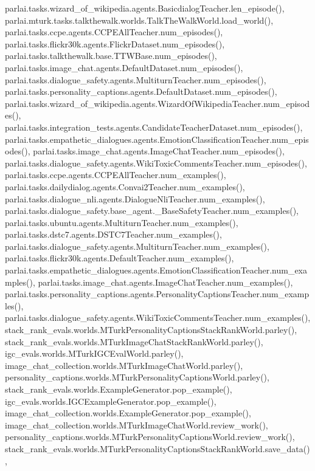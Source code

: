 parlai.\+tasks.\+wizard\+\_\+of\+\_\+wikipedia.\+agents.\+Basicdialog\+Teacher.\+len\+\_\+episode(), parlai.\+mturk.\+tasks.\+talkthewalk.\+worlds.\+Talk\+The\+Walk\+World.\+load\+\_\+world(), parlai.\+tasks.\+ccpe.\+agents.\+C\+C\+P\+E\+All\+Teacher.\+num\+\_\+episodes(), parlai.\+tasks.\+flickr30k.\+agents.\+Flickr\+Dataset.\+num\+\_\+episodes(), parlai.\+tasks.\+talkthewalk.\+base.\+T\+T\+W\+Base.\+num\+\_\+episodes(), parlai.\+tasks.\+image\+\_\+chat.\+agents.\+Default\+Dataset.\+num\+\_\+episodes(), parlai.\+tasks.\+dialogue\+\_\+safety.\+agents.\+Multiturn\+Teacher.\+num\+\_\+episodes(), parlai.\+tasks.\+personality\+\_\+captions.\+agents.\+Default\+Dataset.\+num\+\_\+episodes(), parlai.\+tasks.\+wizard\+\_\+of\+\_\+wikipedia.\+agents.\+Wizard\+Of\+Wikipedia\+Teacher.\+num\+\_\+episodes(), parlai.\+tasks.\+integration\+\_\+tests.\+agents.\+Candidate\+Teacher\+Dataset.\+num\+\_\+episodes(), parlai.\+tasks.\+empathetic\+\_\+dialogues.\+agents.\+Emotion\+Classification\+Teacher.\+num\+\_\+episodes(), parlai.\+tasks.\+image\+\_\+chat.\+agents.\+Image\+Chat\+Teacher.\+num\+\_\+episodes(), parlai.\+tasks.\+dialogue\+\_\+safety.\+agents.\+Wiki\+Toxic\+Comments\+Teacher.\+num\+\_\+episodes(), parlai.\+tasks.\+ccpe.\+agents.\+C\+C\+P\+E\+All\+Teacher.\+num\+\_\+examples(), parlai.\+tasks.\+dailydialog.\+agents.\+Convai2\+Teacher.\+num\+\_\+examples(), parlai.\+tasks.\+dialogue\+\_\+nli.\+agents.\+Dialogue\+Nli\+Teacher.\+num\+\_\+examples(), parlai.\+tasks.\+dialogue\+\_\+safety.\+base\+\_\+agent.\+\_\+\+Base\+Safety\+Teacher.\+num\+\_\+examples(), parlai.\+tasks.\+ubuntu.\+agents.\+Multiturn\+Teacher.\+num\+\_\+examples(), parlai.\+tasks.\+dstc7.\+agents.\+D\+S\+T\+C7\+Teacher.\+num\+\_\+examples(), parlai.\+tasks.\+dialogue\+\_\+safety.\+agents.\+Multiturn\+Teacher.\+num\+\_\+examples(), parlai.\+tasks.\+flickr30k.\+agents.\+Default\+Teacher.\+num\+\_\+examples(), parlai.\+tasks.\+empathetic\+\_\+dialogues.\+agents.\+Emotion\+Classification\+Teacher.\+num\+\_\+examples(), parlai.\+tasks.\+image\+\_\+chat.\+agents.\+Image\+Chat\+Teacher.\+num\+\_\+examples(), parlai.\+tasks.\+personality\+\_\+captions.\+agents.\+Personality\+Captions\+Teacher.\+num\+\_\+examples(), parlai.\+tasks.\+dialogue\+\_\+safety.\+agents.\+Wiki\+Toxic\+Comments\+Teacher.\+num\+\_\+examples(), stack\+\_\+rank\+\_\+evals.\+worlds.\+M\+Turk\+Personality\+Captions\+Stack\+Rank\+World.\+parley(), stack\+\_\+rank\+\_\+evals.\+worlds.\+M\+Turk\+Image\+Chat\+Stack\+Rank\+World.\+parley(), igc\+\_\+evals.\+worlds.\+M\+Turk\+I\+G\+C\+Eval\+World.\+parley(), image\+\_\+chat\+\_\+collection.\+worlds.\+M\+Turk\+Image\+Chat\+World.\+parley(), personality\+\_\+captions.\+worlds.\+M\+Turk\+Personality\+Captions\+World.\+parley(), stack\+\_\+rank\+\_\+evals.\+worlds.\+Example\+Generator.\+pop\+\_\+example(), igc\+\_\+evals.\+worlds.\+I\+G\+C\+Example\+Generator.\+pop\+\_\+example(), image\+\_\+chat\+\_\+collection.\+worlds.\+Example\+Generator.\+pop\+\_\+example(), image\+\_\+chat\+\_\+collection.\+worlds.\+M\+Turk\+Image\+Chat\+World.\+review\+\_\+work(), personality\+\_\+captions.\+worlds.\+M\+Turk\+Personality\+Captions\+World.\+review\+\_\+work(), stack\+\_\+rank\+\_\+evals.\+worlds.\+M\+Turk\+Personality\+Captions\+Stack\+Rank\+World.\+save\+\_\+data(), 